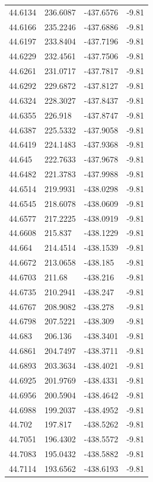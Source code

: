 \begin{table}[H]
\begin{tabular}{llll}
44.6134 & 236.6087 & -437.6576 & -9.81 \\
44.6166 & 235.2246 & -437.6886 & -9.81 \\
44.6197 & 233.8404 & -437.7196 & -9.81 \\
44.6229 & 232.4561 & -437.7506 & -9.81 \\
44.6261 & 231.0717 & -437.7817 & -9.81 \\
44.6292 & 229.6872 & -437.8127 & -9.81 \\
44.6324 & 228.3027 & -437.8437 & -9.81 \\
44.6355 & 226.918 & -437.8747 & -9.81 \\
44.6387 & 225.5332 & -437.9058 & -9.81 \\
44.6419 & 224.1483 & -437.9368 & -9.81 \\
44.645 & 222.7633 & -437.9678 & -9.81 \\
44.6482 & 221.3783 & -437.9988 & -9.81 \\
44.6514 & 219.9931 & -438.0298 & -9.81 \\
44.6545 & 218.6078 & -438.0609 & -9.81 \\
44.6577 & 217.2225 & -438.0919 & -9.81 \\
44.6608 & 215.837 & -438.1229 & -9.81 \\
44.664 & 214.4514 & -438.1539 & -9.81 \\
44.6672 & 213.0658 & -438.185 & -9.81 \\
44.6703 & 211.68 & -438.216 & -9.81 \\
44.6735 & 210.2941 & -438.247 & -9.81 \\
44.6767 & 208.9082 & -438.278 & -9.81 \\
44.6798 & 207.5221 & -438.309 & -9.81 \\
44.683 & 206.136 & -438.3401 & -9.81 \\
44.6861 & 204.7497 & -438.3711 & -9.81 \\
44.6893 & 203.3634 & -438.4021 & -9.81 \\
44.6925 & 201.9769 & -438.4331 & -9.81 \\
44.6956 & 200.5904 & -438.4642 & -9.81 \\
44.6988 & 199.2037 & -438.4952 & -9.81 \\
44.702 & 197.817 & -438.5262 & -9.81 \\
44.7051 & 196.4302 & -438.5572 & -9.81 \\
44.7083 & 195.0432 & -438.5882 & -9.81 \\
44.7114 & 193.6562 & -438.6193 & -9.81 \\

\end{tabular}
\end{table}

